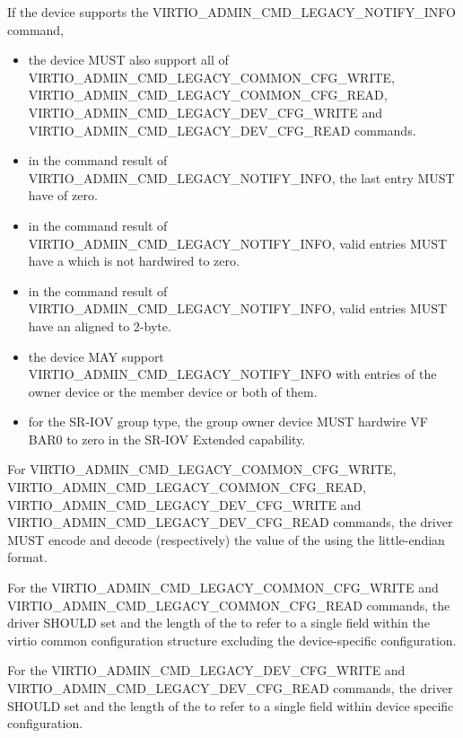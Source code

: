 If the device supports the VIRTIO_ADMIN_CMD_LEGACY_NOTIFY_INFO command,
\begin{itemize}
\item the device MUST also support all of VIRTIO_ADMIN_CMD_LEGACY_COMMON_CFG_WRITE,
VIRTIO_ADMIN_CMD_LEGACY_COMMON_CFG_READ,
VIRTIO_ADMIN_CMD_LEGACY_DEV_CFG_WRITE and
VIRTIO_ADMIN_CMD_LEGACY_DEV_CFG_READ commands.

\item in the command result of VIRTIO_ADMIN_CMD_LEGACY_NOTIFY_INFO, the last
 entry MUST have  of
zero.

\item in the command result of VIRTIO_ADMIN_CMD_LEGACY_NOTIFY_INFO, valid
entries MUST have a  which is not hardwired to zero.

\item in the command result of VIRTIO_ADMIN_CMD_LEGACY_NOTIFY_INFO, valid
entries MUST have an  aligned to 2-byte.

\item the device MAY support VIRTIO_ADMIN_CMD_LEGACY_NOTIFY_INFO with entries
of the owner device or the member device or both of them.

\item for the SR-IOV group type, the group owner device MUST hardwire VF BAR0
to zero in the SR-IOV Extended capability.
\end{itemize}


For VIRTIO_ADMIN_CMD_LEGACY_COMMON_CFG_WRITE,
VIRTIO_ADMIN_CMD_LEGACY_COMMON_CFG_READ,
VIRTIO_ADMIN_CMD_LEGACY_DEV_CFG_WRITE and
VIRTIO_ADMIN_CMD_LEGACY_DEV_CFG_READ commands,
the driver MUST encode and decode (respectively) the value of the 
using the little-endian format.

For the VIRTIO_ADMIN_CMD_LEGACY_COMMON_CFG_WRITE and
VIRTIO_ADMIN_CMD_LEGACY_COMMON_CFG_READ commands,
the driver SHOULD set  and the length of the 
to refer to a single field within the virtio common configuration structure
excluding the device-specific configuration.

For the VIRTIO_ADMIN_CMD_LEGACY_DEV_CFG_WRITE and
VIRTIO_ADMIN_CMD_LEGACY_DEV_CFG_READ commands,
the driver SHOULD set  and the length of the 
to refer to a single field within device specific configuration.

